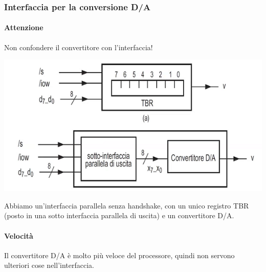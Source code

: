 \documentclass[11pt]{report}
\begin{document}
\subsubsection{Interfaccia per la conversione D/A} 
\paragraph{Attenzione} Non confondere il convertitore con l'interfaccia!
\begin{center}
\includegraphics{img/234.PNG}
\end{center}
Abbiamo un'interfaccia parallela senza handshake, con un unico registro TBR (posto in una sotto interfaccia parallela di uscita) e un convertitore D/A. 
\paragraph{Velocità} Il convertitore D/A è molto più veloce del processore, quindi non servono ulteriori cose nell'interfaccia.
\end{document}
